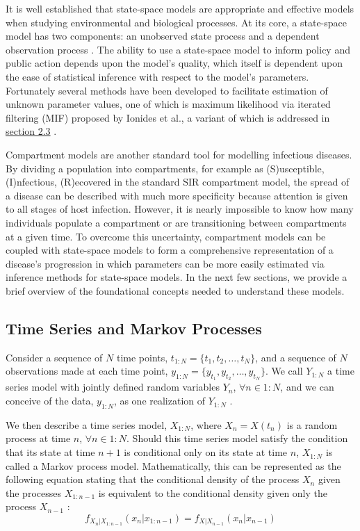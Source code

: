 \documentclass[12pt]{article}
\begin{document}
  It is well established that state\hyp{}space models are appropriate and effective models when studying environmental and biological processes. At its core, a state\hyp{}space model has two components: an unobserved state process and a dependent observation process \cite{Ionides_infdynsys}. The ability to use a state\hyp{}space model to inform policy and public action depends upon the model's quality, which itself is dependent upon the ease of statistical inference with respect to the model's parameters. Fortunately several methods have been developed to facilitate estimation of unknown parameter values, one of which is maximum likelihood via iterated filtering (MIF) proposed by Ionides et al., a variant of which is addressed in \hyperref[sec:like]{section 2.3} \cite{Ionides_if}.
  
  Compartment models are another standard tool for modelling infectious diseases. By dividing a population into compartments, for example as (S)usceptible, (I)nfectious, (R)ecovered in the standard SIR compartment model, the spread of a disease can be described with much more specificity because attention is given to all stages of host infection. However, it is nearly impossible to know how many individuals populate a compartment or are transitioning between compartments at a given time. To overcome this uncertainty, compartment models can be coupled with state\hyp{}space models to form a comprehensive representation of a disease's progression in which parameters can be more easily estimated via inference methods for state\hyp{}space models. In the next few sections, we provide a brief overview of the foundational concepts needed to understand these models.

\subsection{Time Series and Markov Processes}

 Consider a sequence of $N$ time points, $t_{1:N} = \{ t_1, t_2, \dots, t_N \}$, and a sequence of $N$ observations made at each time point, $y_{1:N} = \{ y_{t_1}, y_{t_2}, \dots, y_{t_N} \}$. We call $Y_{1:N}$ a time series model with jointly defined random variables $Y_n$, \hspace{1mm} $\forall n \in 1:N$, and we can conceive of the data, $y_{1:N}$, as one realization of $Y_{1:N}$ \cite{Shumway_ch1}.
  
  We then describe a time series model, $X_{1:N}$, where $X_n = X(t_n)$ is a random process at time $n$, \hspace{1mm} $\forall n \in 1:N$. Should this time series model satisfy the condition that its state at time $n + 1$ is conditional only on its state at time $n$, $X_{1:N}$ is called a Markov process model. Mathematically, this can be represented as the following equation stating that the conditional density of the process $X_n$ given the processes $X_{1:n-1}$ is equivalent to the conditional density given only the process $X_{n-1}$ \cite{cham}:
        \begin{equation}
        f_{X_n|X_{1:n-1}}(x_n|x_{1:n-1}) = f_{X|X_{n-1}}(x_n|x_{n-1})
        \end{equation}
\end{document}
